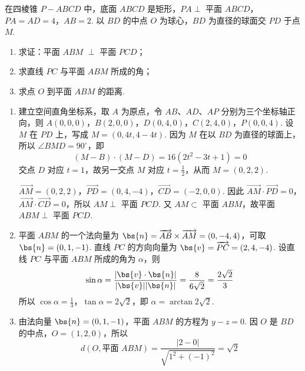 \begin{problem}
在四棱锥 \(P - ABCD\) 中，底面 \(ABCD\) 是矩形，\(PA \perp\) 平面 \(ABCD\)，\(PA = AD = 4\)，\(AB = 2\). 以 \(BD\) 的中点 \(O\) 为球心，\(BD\) 为直径的球面交 \(PD\) 于点 \(M\).
\begin{enumerate}
\item 求证：平面 \(ABM\) \(\perp\) 平面 \(PCD\)；
\item 求直线 \(PC\) 与平面 \(ABM\) 所成的角；
\item 求点 \(O\) 到平面 \(ABM\) 的距离.
\end{enumerate}

\begin{solution}
\begin{enumerate}
\item
建立空间直角坐标系，取 \(A\) 为原点，令 \(AB\)、\(AD\)、\(AP\) 分别为三个坐标轴正向，则
\(A(0,0,0)\)，\(B(2,0,0)\)，\(D(0,4,0)\)，\(C(2,4,0)\)，\(P(0,0,4)\).
设 \(M\) 在 \(PD\) 上，写成 \(M=(0,4t,4-4t)\). 因为 \(M\) 在以 \(BD\) 为直径的球面上，所以 \(\angle BMD=90^{\circ}\)，即
\[
(M-B)\cdot(M-D)=16(2t^{2}-3t+1)=0
\]
交点 \(D\) 对应 \(t=1\)，故另一交点 \(M\) 对应 \(t=\frac12\)，从而 \(M=(0,2,2)\).

\(\overrightarrow{AM}=(0,2,2)\)，\(\overrightarrow{PD}=(0,4,-4)\)，\(\overrightarrow{CD}=(-2,0,0)\). 因此 \(\overrightarrow{AM}\cdot\overrightarrow{PD}=0\)，\(\overrightarrow{AM}\cdot\overrightarrow{CD}=0\)，所以 \(AM\perp\) 平面 \(PCD\). 又 \(AM\subset\) 平面 \(ABM\)，故平面 \(ABM\perp\) 平面 \(PCD\).

\item
平面 \(ABM\) 的一个法向量为 \(\bs{n}=\overrightarrow{AB}\times\overrightarrow{AM}=(0,-4,4)\)，可取 \(\bs{n}=(0,1,-1)\). 直线 \(PC\) 的方向向量为 \(\bs{v}=\overrightarrow{PC}=(2,4,-4)\). 设直线 \(PC\) 与平面 \(ABM\) 所成的角为 \(\alpha\)，则
\[
\sin\alpha=\frac{|\bs{v}\cdot\bs{n}|}{|\bs{v}||\bs{n}|}=\frac8{6\sqrt2}=\frac{2\sqrt2}{3}
\]
所以 \(\cos\alpha=\frac13\)，\(\tan\alpha=2\sqrt2\)，即 \(\alpha=\arctan 2\sqrt2\).

\item
由法向量 \(\bs{n}=(0,1,-1)\)，平面 \(ABM\) 的方程为 \(y-z=0\). 因 \(O\) 是 \(BD\) 的中点，\(O=(1,2,0)\)，所以
\[
d(O,\text{平面 }ABM)=
\frac{|2-0|}{\sqrt{1^{2}+(-1)^{2}}}=\sqrt2
\]
\end{enumerate}
\end{solution}
\end{problem}

